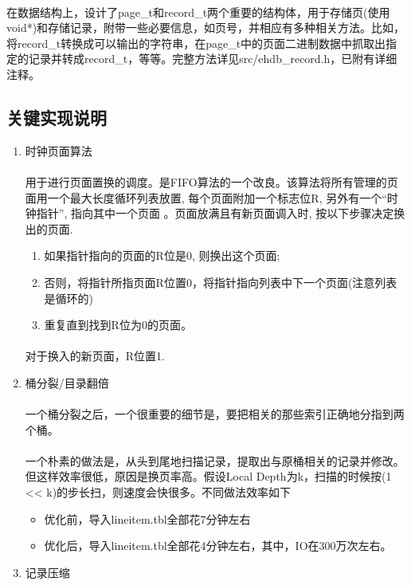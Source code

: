 \documentclass{article}
\begin{document}
        \paragraph{}
            在数据结构上，设计了page\_t和record\_t两个重要的结构体，用于存储页(使用void*)和存储记录，附带一些必要信息，如页号，并相应有多种相关方法。比如，将record\_t转换成可以输出的字符串，在page\_t中的页面二进制数据中抓取出指定的记录并转成record\_t，等等。完整方法详见src/ehdb\_record.h，已附有详细注释。
    \subsection{关键实现说明}
        \begin{enumerate}
            \item 时钟页面算法
                \paragraph{}
                    用于进行页面置换的调度。是FIFO算法的一个改良。该算法将所有管理的页面用一个最大长度循环列表放置, 每个页面附加一个标志位R, 另外有一个“时钟指针”, 指向其中一个页面 。页面放满且有新页面调入时, 按以下步骤决定换出的页面.
                    \begin{enumerate}
                        \item 如果指针指向的页面的R位是0, 则换出这个页面;
                        \item 否则，将指针所指页面R位置0，将指针指向列表中下一个页面(注意列表是循环的)
                        \item 重复直到找到R位为0的页面。
                    \end{enumerate}
                \paragraph{}
                    对于换入的新页面，R位置1.
            \item 桶分裂/目录翻倍
                \paragraph{}
                    一个桶分裂之后，一个很重要的细节是，要把相关的那些索引正确地分指到两个桶。
                \paragraph{}
                    一个朴素的做法是，从头到尾地扫描记录，提取出与原桶相关的记录并修改。但这样效率很低，原因是换页率高。假设Local Depth为k，扫描的时候按(1 << k)的步长扫，则速度会快很多。不同做法效率如下
                \begin{itemize}
                    \item 优化前，导入lineitem.tbl全部花7分钟左右
                    \item 优化后，导入lineitem.tbl全部花4分钟左右，其中，IO在300万次左右。
                \end{itemize}
            \item 记录压缩

\end{enumerate}
\end{document}
